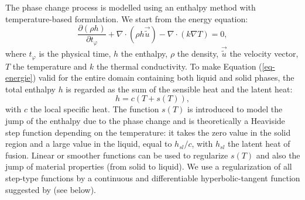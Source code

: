 The phase change process is modelled using an enthalpy method \citep{voller1987pcm,Cao1989,Cao1990} with temperature-based formulation. We start from the energy equation:
\begin{equation}
\label{eq-energie}
   \frac{\partial (\rho h)}{\partial t_{\varphi}} + \nabla \cdot(\rho h \vec{\tilde{u}}) - \nabla \cdot (k \nabla T) = 0,
\end{equation}
where $t_{\varphi}$ is the physical time, $h$ the enthalpy, $\rho$ the density, $\vec{\tilde{u}}$  the velocity vector, $T$ the temperature and $k$ the thermal conductivity. 
To make Equation (\ref{eq-energie})  valid for the entire domain containing both liquid and solid phases, the total enthalpy $h$ is regarded as the sum of the sensible heat and the latent heat:
\begin{equation}
\label{eq-enth-model}
  h = c ( T + s(T) ),
\end{equation} 
with $c$ the local specific heat. The function $s(T)$ is introduced to model the jump of the enthalpy due to the phase change and is theoretically a Heaviside step function depending on the temperature: it takes the zero value in the solid region and a large value in the liquid, equal to $h_{sl}/c$, with $h_{sl}$ the latent heat of fusion. 
Linear  \citep{voller1987pcm,Wang2010} or smoother functions \citep{dan-2014-JCP} can be used to regularize $s(T)$ and also the jump of material properties (from solid to liquid). 
We use a regularization of all step-type functions by a continuous and differentiable hyperbolic-tangent function suggested by \cite{dan-2014-JCP} (see below). 

